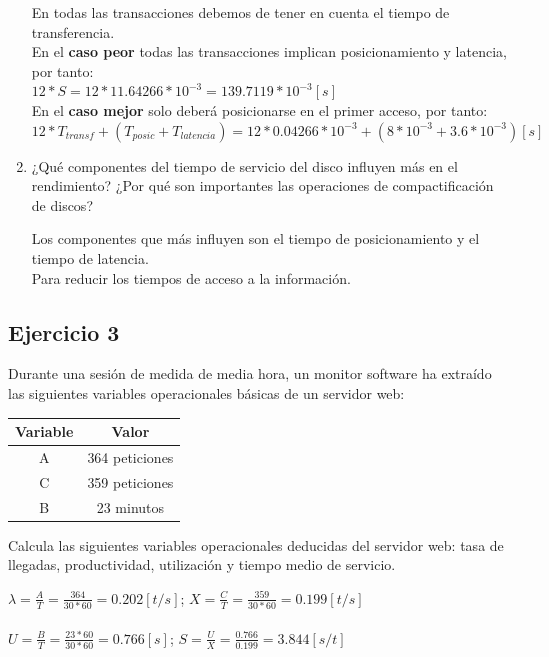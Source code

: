 \begin{enumerate}
\begin{tcolorbox}[colback=white,colframe=cyan!50!black,fonttitle=\bfseries]
    En todas las transacciones debemos de tener en cuenta el tiempo de transferencia.\\
    En el \textbf{caso peor} todas las transacciones implican posicionamiento y latencia, por tanto:\\
    $12*S=12*11.64266*10^{-3}=139.7119*10^{-3}[s]$\\
    En el \textbf{caso mejor} solo deberá posicionarse en el primer acceso, por tanto:\\
    $12*T_{transf}+(T_{posic}+T_{latencia})=12*0.04266*10^{-3}+(8*10^{-3}+3.6*10^{-3})[s]$
    \end{tcolorbox}
    \item ¿Qué componentes del tiempo de servicio del disco influyen más en el rendimiento? ¿Por qué son importantes las operaciones de compactificación de discos?
    \begin{tcolorbox}[colback=white,colframe=cyan!50!black,fonttitle=\bfseries]
    Los componentes que más influyen son el tiempo de posicionamiento y el tiempo de latencia.\\Para reducir los tiempos de acceso a la información.
    \end{tcolorbox}
\end{enumerate}

\subsection{Ejercicio 3}
Durante una sesión de medida de media hora, un monitor software ha extraído las siguientes variables operacionales básicas de un servidor web:

\begin{table}[H]\centering
\begin{tabular}{|c|c|}
\hline
\textbf{Variable} & \textbf{Valor}          \\ \hline
A        & 364 peticiones \\ \hline
C        & 359 peticiones \\ \hline
B        & 23 minutos     \\ \hline
\end{tabular}
\end{table}
Calcula las siguientes variables operacionales deducidas del servidor web: tasa de llegadas, productividad, utilización y tiempo medio de servicio.
\begin{tcolorbox}[colback=white,colframe=cyan!50!black,fonttitle=\bfseries]
$\lambda = \frac{A}{T} = \frac{364}{30*60}=0.202[t/s]$; 
$X = \frac{C}{T}=\frac{359}{30*60}=0.199[t/s]$\\\\
$U = \frac{B}{T}=\frac{23*60}{30*60}=0.766[s]$; 
$S = \frac{U}{X}=\frac{0.766}{0.199}=3.844[s/t]$
\end{tcolorbox}
